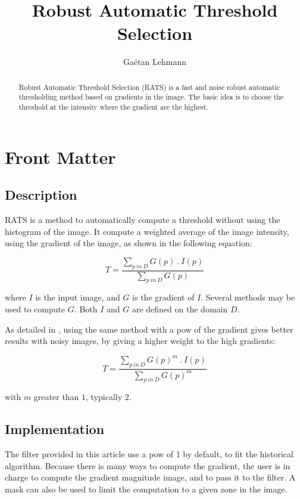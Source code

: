\documentclass{InsightArticle}
\title{Robust Automatic Threshold Selection}
\author{Ga\"etan Lehmann}
\begin{document}
\maketitle

\ifhtml
\chapter*{Front Matter\label{front}}
\fi


\begin{abstract}
\noindent
Robust Automatic Threshold Selection (RATS) \cite{Kittler1985} is a fast and noise robust
automatic thresholding method based on gradients in the image. The basic idea is to choose
the threshold at the intensity where the gradient are the highest.
\end{abstract}


\section{Description}

RATS is a method to automatically compute a threshold without using the histogram of
the image. It compute a weighted average of the image intensity, using the gradient
of the image, as shown in the following equation:

$$
T = \frac{\sum\limits_{p~in~D}G(p)~.~I(p)}{\sum\limits_{p~in~D}G(p)}
$$

where $I$ is the input image, and $G$ is the gradient of $I$. Several methods may
be used to compute $G$. Both $I$ and $G$ are defined on the domain $D$.

As detailed in \cite{Wilkison98}, using the same method with a pow of the gradient
gives better results with noisy images, by giving a higher weight to the high gradients:

$$
T = \frac{\sum\limits_{p~in~D}G(p)^m~.~I(p)}{\sum\limits_{p~in~D}G(p)^m}
$$

with $m$ greater than $1$, typically $2$.



\section{Implementation}

The filter provided in this article use a pow of 1 by default, to fit the historical algorithm.
Because there is many ways to compute the gradient, the user is in charge to compute the gradient
magnitude image, and to pass it to the filter.
A mask can also be used to limit the computation to a given zone in the image.
\end{document}
